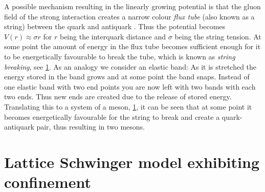 \documentclass[../main.tex]{subfiles} %
\begin{document}
\begin{figure}[t]
    \label{fig:QuarkConfinement}
\end{figure}

A possible mechanism resulting in the linearly growing potential is that the gluon field of the strong interaction creates a narrow colour \emph{flux tube} (also known as a string) between the quark and antiquark \cite{brandt_effectiveStringDescriptionOfConfiningFluxTubes_2016}. Thus the potential becomes $V(r) \approx \sigma r$ for $r$ being the interquark distance and $\sigma$ being the string tension. At some point the amount of energy in the flux tube becomes sufficient enough for it to be energetically favourable to break the tube, which is known as \emph{string breaking}, see \cref{fig:QuarkConfinement}. As an analogy we consider an elastic band: As it is stretched the energy stored in the band grows and at some point the band snaps. Instead of one elastic band with two end points you are now left with two bands with each two ends. Thus new ends are created due to the release of stored energy. Translating this to a system of a meson, \cref{fig:QuarkConfinement}, it can be seen that at some point it becomes energetically favourable for the string to break and create a quark-antiquark pair, thus resulting in two mesons.





\section{Lattice Schwinger model exhibiting confinement} \label{sec:LatticeSchwingerModelAndConfienemt}
\end{document}
